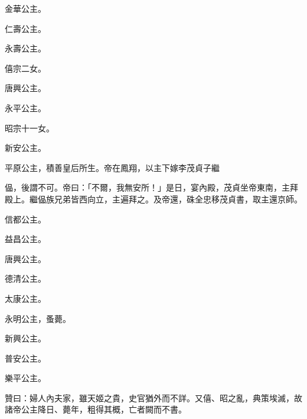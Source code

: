 \begin{pinyinscope}
 金華公主。



 仁壽公主。



 永壽公主。



 僖宗二女。



 唐興公主。



 永平公主。



 昭宗十一女。



 新安公主。



 平原公主，積善皇后所生。帝在鳳翔，以主下嫁李茂貞子繼



 偘，後謂不可。帝曰：「不爾，我無安所！」是日，宴內殿，茂貞坐帝東南，主拜殿上。繼偘族兄弟皆西向立，主遍拜之。及帝還，硃全忠移茂貞書，取主還京師。



 信都公主。



 益昌公主。



 唐興公主。



 德清公主。



 太康公主。



 永明公主，蚤薨。



 新興公主。



 普安公主。



 樂平公主。



 贊曰：婦人內夫家，雖天姬之貴，史官猶外而不詳。又僖、昭之亂，典策埃滅，故諸帝公主降日、薨年，粗得其概，亡者闕而不書。



\end{pinyinscope}